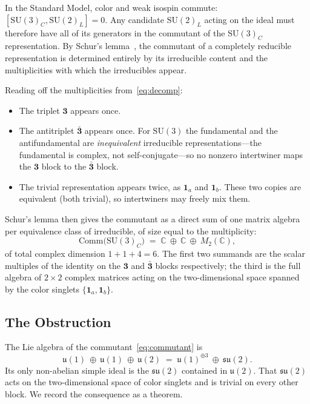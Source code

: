 \documentclass[12pt]{article}
\theoremstyle{remark}
\newcommand{\su}{\mathrm{SU}}
\newcommand{\Cplx}{\mathbb{C}}
\newcommand{\Comm}{\mathrm{Comm}}
\begin{document}
In the Standard Model, color and weak isospin commute:
$[\su(3)_C,\su(2)_L]=0$.  Any candidate $\su(2)_L$ acting on the ideal must
therefore have all of its generators in the commutant of the $\su(3)_C$
representation.  By Schur's lemma~\cite{FultonHarris}, the commutant of a
completely reducible representation is determined entirely by its irreducible
content and the multiplicities with which the irreducibles appear.

Reading off the multiplicities from~\eqref{eq:decomp}:
\begin{itemize}
	\item The triplet $\mathbf{3}$ appears once.
	\item The antitriplet $\bar{\mathbf{3}}$ appears once.  For $\su(3)$ the
	fundamental and the antifundamental are \emph{inequivalent} irreducible
	representations---the fundamental is complex, not self-conjugate---so no
	nonzero intertwiner maps the $\mathbf{3}$ block to the $\bar{\mathbf{3}}$
	block.
	\item The trivial representation appears twice, as $\mathbf{1}_a$ and
	$\mathbf{1}_b$.  These two copies are equivalent (both trivial), so
	intertwiners may freely mix them.
\end{itemize}
Schur's lemma then gives the commutant as a direct sum of one matrix algebra per
equivalence class of irreducible, of size equal to the multiplicity:
\begin{equation}
	\Comm\bigl(\su(3)_C\bigr) \;=\; \Cplx\ \oplus\ \Cplx\ \oplus\ M_2(\Cplx),
	\label{eq:commutant}
\end{equation}
of total complex dimension $1+1+4=6$.  The first two summands are the scalar
multiples of the identity on the $\mathbf{3}$ and $\bar{\mathbf{3}}$ blocks
respectively; the third is the full algebra of $2\times2$ complex matrices
acting on the two-dimensional space spanned by the color singlets
$\{\mathbf{1}_a,\mathbf{1}_b\}$.

\subsection{The Obstruction}
\label{sec:obstruction}

The Lie algebra of the commutant~\eqref{eq:commutant} is
\begin{equation}
	\mathfrak{u}(1)\ \oplus\ \mathfrak{u}(1)\ \oplus\ \mathfrak{u}(2)
	\;=\; \mathfrak{u}(1)^{\oplus 3}\ \oplus\ \mathfrak{su}(2).
	\label{eq:liealg}
\end{equation}
Its only non-abelian simple ideal is the $\mathfrak{su}(2)$ contained in
$\mathfrak{u}(2)$.  That $\mathfrak{su}(2)$ acts on the two-dimensional space of
color singlets and is trivial on every other block.  We record the consequence
as a theorem.
\end{document}
